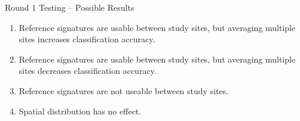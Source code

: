\documentclass[  compress,xcolor={usenames,dvipsnames}]{beamer}
\begin{document}
\begin{frame}{Round 1 Testing -- Possible Results}
\begin{enumerate}
  \item Reference signatures are usable between study sites, but averaging multiple sites increases classification accuracy.
  \item Reference signatures are usable between study sites, but averaging multiple sites decreases classification accuracy.
  \item Reference signatures are not useable between study sites.
  \item Spatial distribution has no effect.
\end{enumerate}
\end{frame}
\end{document}
